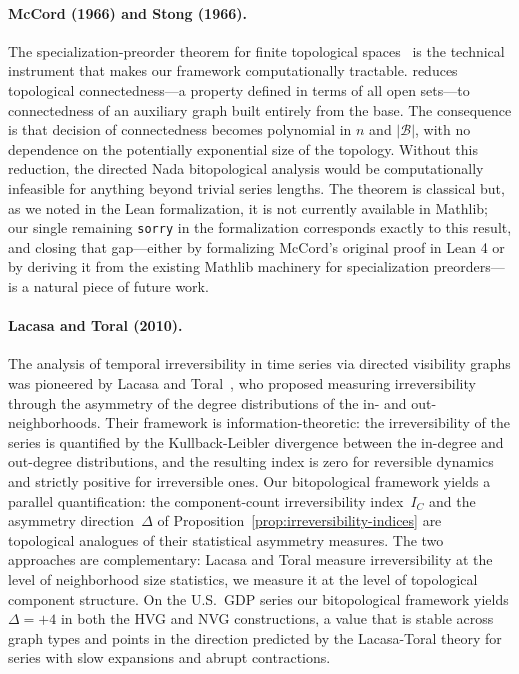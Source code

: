 \documentclass[11pt,a4paper]{article}
\theoremstyle{plain}
\theoremstyle{definition}
\newcommand{\base}{\mathcal{B}}
\begin{document}
\paragraph{McCord (1966) and Stong (1966).}
The specialization-preorder theorem for finite topological
spaces~\cite{McCord1966,Stong1966} is the technical instrument that
makes our framework computationally tractable.
 reduces topological connectedness---a
property defined in terms of all open sets---to connectedness of an
auxiliary graph built entirely from the base. The consequence is that
decision of connectedness becomes polynomial in $n$ and $|\base|$,
with no dependence on the potentially exponential size of the
topology. Without this reduction, the directed Nada bitopological
analysis would be computationally infeasible for anything beyond trivial
series lengths. The theorem is classical but, as we noted in the Lean
formalization, it is not currently available in Mathlib; our single
remaining \texttt{sorry} in the formalization corresponds exactly to
this result, and closing that gap---either by formalizing McCord's
original proof in Lean 4 or by deriving it from the existing Mathlib
machinery for specialization preorders---is a natural piece of future
work.

\paragraph{Lacasa and Toral (2010).}
The analysis of temporal irreversibility in time series via directed
visibility graphs was pioneered by Lacasa and Toral~\cite{LacasaToral2010},
who proposed measuring irreversibility through the asymmetry of the
degree distributions of the in- and out-neighborhoods. Their framework
is information-theoretic: the irreversibility of the series is
quantified by the Kullback-Leibler divergence between the in-degree
and out-degree distributions, and the resulting index is zero for
reversible dynamics and strictly positive for irreversible ones. Our
bitopological framework yields a parallel quantification: the
component-count irreversibility index~$I_C$ and the asymmetry
direction~$\Delta$ of
Proposition~\ref{prop:irreversibility-indices} are topological
analogues of their statistical asymmetry measures. The two approaches
are complementary: Lacasa and Toral measure irreversibility at the
level of neighborhood size statistics, we measure it at the level of
topological component structure. On the U.S.\ GDP series our
bitopological framework yields $\Delta = +4$ in both the HVG and NVG
constructions, a value that is stable across graph types and points in
the direction predicted by the Lacasa-Toral theory for series with
slow expansions and abrupt contractions.
\end{document}
